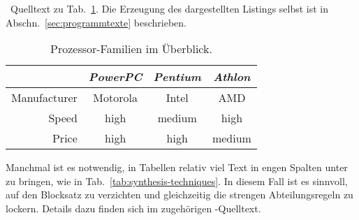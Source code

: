 \begin{program}
\caption{\latex\ Quelltext zu Tab.~\ref{tab:processors}.
Die Erzeugung des dargestellten Listings selbst ist in Abschn.\ \ref{sec:programmtexte} beschrieben.}
\label{prog:processors-source}
%
\begin{LaTeXCode}[numbers=none]
\begin{table}
	\caption{Prozessor-Familien im Überblick.}
	\label{tab:processors}
	\centering
	\setlength{\tabcolsep}{5mm}	%
	\def\arraystretch{1.25}		%
	\begin{tabular}{|r||c|c|c|} 
		\hline
		& \emph{PowerPC} & \emph{Pentium} & \emph{Athlon} \\
		\hline
		\hline
		Manufacturer & Motorola & Intel & AMD \\
		\hline
		Speed & high & medium & high   \\
		\hline
		Price & high & high   & medium \\
		\hline
	\end{tabular}
\end{table}
\end{LaTeXCode}
%
\end{program}

Manchmal ist es notwendig, in Tabellen relativ viel Text in engen Spalten
unter zu bringen, wie in Tab.~\ref{tab:synthesis-techniques}. In diesem Fall
ist es sinnvoll, auf den Blocksatz zu verzichten und gleichzeitig die
strengen Abteilungsregeln zu lockern. Details dazu finden sich im zugehörigen
\latex-Quelltext.


